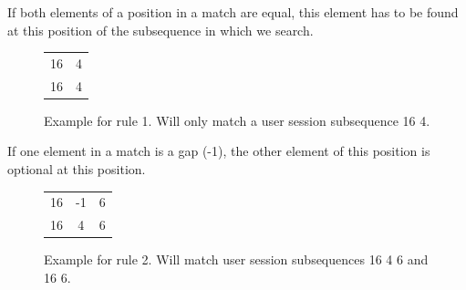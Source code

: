 	\begin{rules}
		\item If both elements of a position in a match are equal, this element has to be found at this position of the subsequence in which we search.
	\end{rules}
	\begin{figure}[h]
		\centering
			\begin{tabular}{cc}
				 16 & 4\\
				 16 & 4\\
			\end{tabular}
		\caption{Example for rule 1. Will only match a user session subsequence 16 4.}
		\label{fig:rule1}
	\end{figure}


	\begin{rules}
		\item If one element in a match is a gap (-1), the other element of this position is optional at this position.
	\end{rules}
	\begin{figure}[h]
		\centering
			\begin{tabular}{ccc}
				16 & -1 &6\\
				16 &  4 & 6\\
			\end{tabular}
			\caption{Example for rule 2. Will match user session subsequences 16 4 6 and 16 6.}
		\label{fig:rule2}
	\end{figure}

